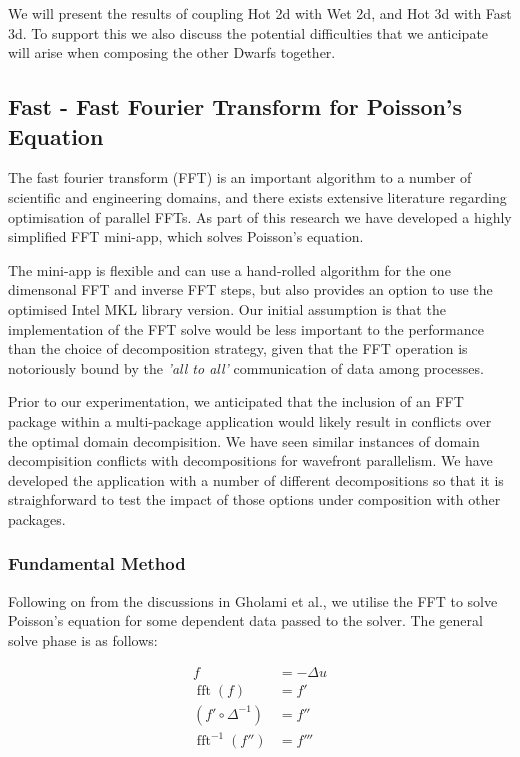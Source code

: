 \documentclass[runningheads,a4paper]{llncs}
\DeclareMathOperator{\fft}{fft}
\begin{document}
We will present the results of coupling Hot 2d with Wet 2d, and Hot 3d with Fast 3d. To support this we also discuss the potential difficulties that we anticipate will arise when composing the other Dwarfs together.

\subsection{Fast - Fast Fourier Transform for Poisson's Equation}

\label{sec:fast}

The fast fourier transform (FFT) is an important algorithm to a number of scientific and engineering domains, and there exists extensive literature regarding optimisation of parallel FFTs. As part of this research we have developed a highly simplified FFT mini-app, which solves Poisson's equation.

The mini-app is flexible and can use a hand-rolled algorithm for the one dimensonal FFT and inverse FFT steps, but also provides an option to use the optimised Intel MKL library version. Our initial assumption is that the implementation of the FFT solve would be less important to the performance than the choice of decomposition strategy, given that the FFT operation is notoriously bound by the \textit{'all to all'} communication of data among processes.

Prior to our experimentation, we anticipated that the inclusion of an FFT package within a multi-package application would likely result in conflicts over the optimal domain decompisition. We have seen similar instances of domain decompisition conflicts with decompositions for wavefront parallelism. We have developed the application with a number of different decompositions so that it is straighforward to test the impact of those options under composition with other packages.

\subsubsection{Fundamental Method}

Following on from the discussions in Gholami et al., we utilise the FFT to solve Poisson's equation for some dependent data passed to the solver. The general solve phase is as follows:

\begin{align}
  f &= -\Delta u \\
  \fft(f) &= f' \\
  (f' \circ \Delta^{-1}) &= f'' \\
  \fft^{-1}(f'') &= f'''
\end{align}
\end{document}
